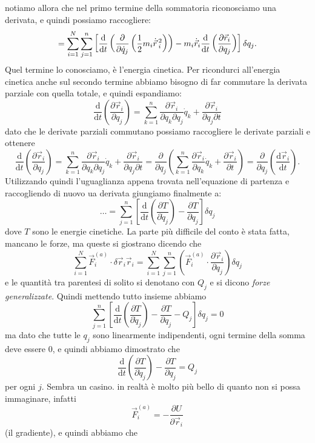 \documentclass[11pt]{scrartcl}
\newcommand{\dif}{\text{d}}
\newcommand{\posit}{\vec{r}}
\newcommand{\veloc}{\dot{\vec{r}}}
\begin{document}
	notiamo allora che nel primo termine della sommatoria riconosciamo una derivata, e quindi possiamo raccogliere:
	$$=\sum_{i=1}^{N}\sum_{j=1}^{n}\left[\frac{\dif}{\dif t}\left(\frac{\partial}{\partial \dot{q}_j}\left(\half m_i \veloc\,^2_i\right)\right)-m_i\veloc_i\frac{\dif}{\dif t}\left(\frac{\partial \posit_i}{\partial q_j}\right)\right]\delta q_j.$$
	Quel termine lo conosciamo, è l'energia cinetica. Per ricondurci all'energia cinetica anche sul secondo termine abbiamo bisogno di far commutare la derivata parziale con quella totale, e quindi espandiamo:
	$$\frac{\dif}{\dif t}\left(\frac{\partial \posit_i}{\partial q_j}\right)=\sum_{k=1}^{n}\frac{\partial \posit_i}{\partial q_k \partial q_j}\dot{q}_k+\frac{\partial \posit_i}{\partial q_j\partial t}$$
	dato che le derivate parziali commutano possiamo raccogliere le derivate parziali e ottenere
	$$\frac{\dif}{\dif t}\left(\frac{\partial \posit_i}{\partial q_j}\right)=\sum_{k=1}^{n}\frac{\partial \posit_i}{\partial q_k \partial q_j}\dot{q}_k+\frac{\partial \posit_i}{\partial q_j\partial t}=\frac{\partial}{\partial q_j}\left(\sum_{k=1}^{n}\frac{\partial \posit_i}{\partial q_k }\dot{q}_k+\frac{\partial \posit_i}{\partial t}\right)=\frac{\partial}{\partial q_j}\left(\frac{\dif \posit_i}{\dif t}\right).$$
	Utilizzando quindi l'uguaglianza appena trovata nell'equazione di partenza e raccogliendo di nuovo ua derivata giungiamo finalmente a:
	$$\dots=\sum_{j=1}^{n}\left[\frac{\dif}{\dif t}\left(\frac{\partial T}{\partial \dot{q}_j}\right)-\frac{\partial T}{\partial q_j}\right]\delta q_j$$
	dove $T$ sono le energie cinetiche. La parte più difficile del conto è stata fatta, mancano le forze, ma queste si giostrano dicendo che 
	$$\sum_{i=1}^{N}\vec{F}_i^{(a)}\cdot\delta\posit_i \posit_i=\sum_{i=1}^{N}\sum_{j=1}^{n}\left(\vec{F}_i^{(a)}\cdot\frac{\partial \posit_i}{\partial q_j}\right)\delta q_j$$
	e le quantità tra parentesi di solito si denotano con $Q_j$ e si dicono \textit{forze generalizzate}. Quindi mettendo tutto insieme abbiamo
	$$\sum_{j=1}^{n}\left[\frac{\dif}{\dif t}\left(\frac{\partial T}{\partial \dot{q}_j}\right)-\frac{\partial T}{\partial q_j}-Q_j\right]\delta q_j=0$$
	ma dato che tutte le $q_j$ sono linearmente indipendenti, ogni termine della somma deve essere $0$, e quindi abbiamo dimostrato che 
	$$\frac{\dif}{\dif t}\left(\frac{\partial T}{\partial \dot{q}_j}\right)-\frac{\partial T}{\partial q_j}=Q_j$$
	per ogni $j$. Sembra un casino. in realtà è molto più bello di quanto non si possa immaginare, infatti
	$$\vec{F}_i^{(a)}=-\frac{\partial U}{\partial \posit_i}$$ 
	(il gradiente), e quindi abbiamo che
\end{document}
